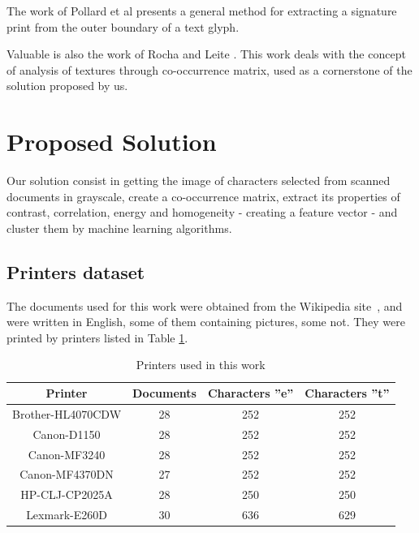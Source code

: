 \documentclass[10pt,twocolumn,letterpaper]{article}
\begin{document}
The work of Pollard et al \cite{Pollard} presents a general method for extracting a signature print from the outer boundary of a text glyph.

Valuable is also the work of Rocha and Leite \cite{Rocha}. This work deals with the concept of analysis of textures through co-occurrence matrix, used as a cornerstone of the solution proposed by us.

\section{Proposed Solution}
\label{sec:proposed_solution}

Our solution consist in getting the image of characters selected from scanned documents in grayscale, create a co-occurrence matrix, extract its properties of contrast, correlation, energy and homogeneity - creating a feature vector - and cluster them by machine learning algorithms.

\subsection{Printers dataset}
\label{subsec:printers_dataset}

The documents used for this work were obtained from the Wikipedia site~\cite{Wikipedia}, and were written in English, some of them containing pictures, some not. They were printed by printers listed in Table \ref{tab:printers}. 






\begin{table}
\caption{Printers used in this work}
\label{tab:printers}
\begin{center}
    \begin{tabular}{ | c | c | c | c |}
    \hline
Printer & Documents & Characters ''e'' & Characters ''t'' \\ \hline
Brother-HL4070CDW & 28 & 252 & 252\\
Canon-D1150 & 28 & 252 & 252\\
Canon-MF3240 & 28 & 252 & 252\\
Canon-MF4370DN & 27 & 252 & 252 \\
HP-CLJ-CP2025A & 28 & 250 & 250\\
Lexmark-E260D & 30 & 636 & 629\\
\hline
    \end{tabular}
\end{center}    
\end{table}
\end{document}
